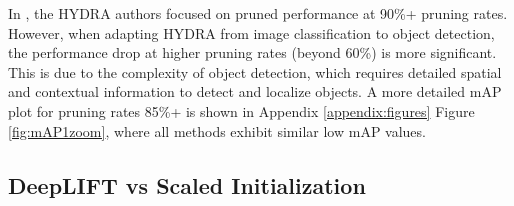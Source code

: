 \documentclass[10pt]{cai}
\begin{document}
In \cite{hydra}, the HYDRA authors focused on pruned performance at 90\%+ pruning rates. However, when adapting HYDRA from image classification to object detection, the performance drop at higher pruning rates (beyond 60\%) is more significant. This is due to the complexity of object detection, which requires detailed spatial and contextual information to detect and localize objects. A more detailed mAP plot for pruning rates 85\%+ is shown in Appendix \ref{appendix:figures} Figure \ref{fig:mAP1zoom}, where all methods exhibit similar low mAP values.

\subsection{DeepLIFT vs Scaled Initialization}
\label{sec1}
\end{document}
